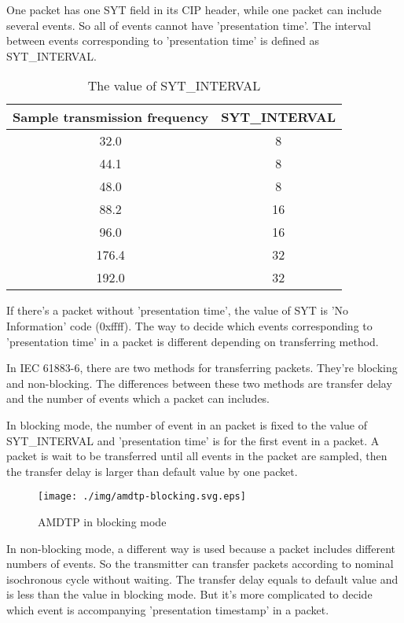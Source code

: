 \documentclass[onecolumn]{article}
\begin{document}
One packet has one SYT field in its CIP header, while one packet can include several events. So all of events cannot have 'presentation time'. The interval between events corresponding to 'presentation time' is defined as SYT\_INTERVAL.

\begin{table}[ht]
	\centering
	\caption{{The value of SYT\_INTERVAL}}
	\label{syt_interval}
	\begin{tabular}{cc} \toprule
		Sample transmission frequency & SYT\_INTERVAL \\ \midrule
		32.0	& 8	\\
		44.1	& 8	\\
		48.0	& 8	\\
		88.2	& 16	\\
		96.0	& 16	\\
		176.4	& 32	\\
		192.0	& 32	\\ \bottomrule
	\end{tabular}
\end{table}

If there's a packet without 'presentation time', the value of SYT is 'No Information' code (0xffff). The way to decide which events corresponding to 'presentation time' in a packet is different depending on transferring method.

In IEC 61883-6\cite{iec61883-6-1,iec61883-6-2}, there are two methods for transferring packets. They're blocking and non-blocking. The differences between these two methods are transfer delay and the number of events which a packet can includes.

In blocking mode, the number of event in an packet is fixed to the value of SYT\_INTERVAL and 'presentation time' is for the first event in a packet. A packet is wait to be transferred until all events in the packet are sampled, then the transfer delay is larger than default value by one packet.

\begin{figure}[H]
	\centering
	\texttt{[image: ./img/amdtp-blocking.svg.eps]}
	\caption{{AMDTP in blocking mode}}
	\label{amdtp-blocking}
\end{figure}

In non-blocking mode, a different way is used because a packet includes different numbers of events. So the transmitter can transfer packets according to nominal isochronous cycle without waiting. The transfer delay equals to default value and is less than the value in blocking mode. But it's more complicated to decide which event is accompanying 'presentation timestamp' in a packet.
\end{document}
